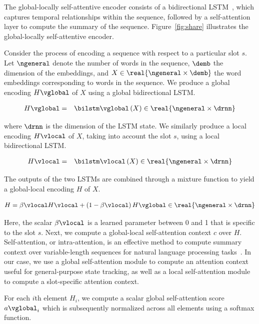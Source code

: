\documentclass[11pt,a4paper]{article}
\begin{document}
The global-locally self-attentive encoder consists of a bidirectional LSTM~\citep{Hochreiter1997Long}, which captures temporal relationships within the sequence, followed by a self-attention layer to compute the summary of the sequence.
Figure~\ref{fig:share} illustrates the global-locally self-attentive encoder.

Consider the process of encoding a sequence with respect to a particular slot $s$.
Let $\ngeneral$ denote the number of words in the sequence, $\demb$ the dimension of the embeddings, and $X \in \real{\ngeneral \times \demb}$ the word embeddings corresponding to words in the sequence.
We produce a global encoding $H\vglobal$ of $X$ using a global bidirectional LSTM.

\begin{eqnarray}
H\vglobal &=& \bilstm\vglobal \left( X \right) \in \real{\ngeneral \times \drnn}
\end{eqnarray}

where $\drnn$ is the dimension of the LSTM state.
We similarly produce a local encoding $H\vlocal$ of $X$, taking into account the slot $s$, using a local bidirectional LSTM.

\begin{eqnarray}
H\vlocal &=& \bilstm\vlocal \left( X \right) \in \real{\ngeneral \times \drnn}
\end{eqnarray}

The outputs of the two LSTMs are combined through a mixture function to yield a global-local encoding $H$ of $X$. 

\begin{eqnarray}
H = \beta\vlocal H\vlocal + \left( 1 - \beta\vlocal \right) H\vglobal \in \real{\ngeneral \times \drnn}
\end{eqnarray}

Here, the scalar $\beta\vlocal$ is a learned parameter between 0 and 1 that is specific to the slot $s$.
Next, we compute a global-local self-attention context $c$ over $H$.
Self-attention, or intra-attention, is an effective method to compute summary context over variable-length sequences for natural language processing tasks~\citep{cheng2016long,Vaswani2017attention,he2017deep,lee2017end}.
In our case, we use a global self-attention module to compute an attention context useful for general-purpose state tracking, as well as a local self-attention module to compute a slot-specific attention context.

For each $i$th element $H_i$, we compute a scalar global self-attention score $a\vglobal_i$ which is subsequently normalized across all elements using a softmax function.
\end{document}
